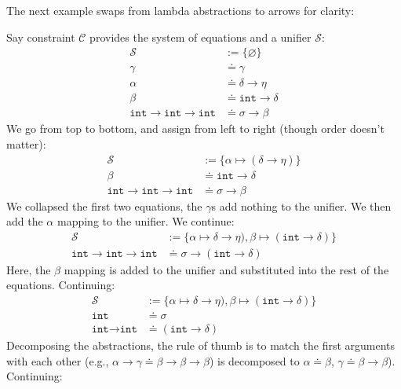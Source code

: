 \noindent
The next example swaps from lambda abstractions to arrows for clarity:
\begin{Example}

    Say constraint $\mathcal{C}$ provides the system of equations and a unifier $\mathcal{S}$:
    \begin{align*}
        \mathcal{S} &:= \{\varnothing\}\\
        \gamma &\doteq \gamma\\ 
        \alpha &\doteq \delta \to \eta \\
        \beta &\doteq \texttt{int} \to \delta\\
        \texttt{int} \to \texttt{int} \to \texttt{int} &\doteq \sigma \to \beta
    \end{align*}
    \noindent
    We go from top to bottom, and assign from left to right (though order doesn't matter):
    \begin{align*}
    \mathcal{S} &:= \{\alpha \mapsto (\delta \to \eta)\}\\
    \beta &\doteq \texttt{int} \to \delta\\
    \texttt{int} \to \texttt{int} \to \texttt{int} &\doteq \sigma \to \beta
    \end{align*}
    \noindent
    We collapsed the first two equations, the $\gamma$s add nothing to the unifier. We then add the $\alpha$ mapping to the unifier.
    We continue:
    \begin{align*} 
        \mathcal{S} &:= \{\alpha \mapsto \delta \to \eta), \beta \mapsto (\texttt{int} \to \delta)\}\\
        \texttt{int} \to \texttt{int} \to \texttt{int} &\doteq \sigma \to (\texttt{int} \to \delta)
    \end{align*}
    \noindent
    Here, the $\beta$ mapping is added to the unifier and substituted into the rest of the equations. Continuing:
    \begin{align*}
        \mathcal{S} &:= \{\alpha \mapsto \delta \to \eta), \beta \mapsto (\texttt{int} \to \delta)\}\\
        \texttt{int} &\doteq \sigma\\
        \texttt{int} \to \texttt{int} &\doteq (\texttt{int} \to \delta)
    \end{align*}
    \noindent
    Decomposing the abstractions, the rule of thumb is to match the first arguments with each other (e.g., $\alpha\to\gamma \doteq \beta\to\beta\to\beta$) is decomposed to $\alpha \doteq \beta$, $\gamma \doteq \beta\to\beta$). Continuing:

\end{Example}
